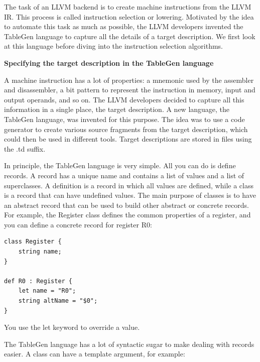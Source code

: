 
The task of an LLVM backend is to create machine instructions from the LLVM IR. This process is called instruction selection or lowering. Motivated by the idea to automate this task as much as possible, the LLVM developers invented the TableGen language to capture all the details of a target description. We first look at this language before diving into the instruction selection algorithms.\par

\hspace*{\fill} \par %
\textbf{Specifying the target description in the TableGen language}

A machine instruction has a lot of properties: a mnemonic used by the assembler and disassembler, a bit pattern to represent the instruction in memory, input and output operands, and so on. The LLVM developers decided to capture all this information in a single place, the target description. A new language, the TableGen language, was invented for this purpose. The idea was to use a code generator to create various source fragments from the target description, which could then be used in different tools. Target descriptions are stored in files using the .td suffix.\par

In principle, the TableGen language is very simple. All you can do is define records. A record has a unique name and contains a list of values and a list of superclasses. A definition is a record in which all values are defined, while a class is a record that can have undefined values. The main purpose of classes is to have an abstract record that can be used to build other abstract or concrete records. For example, the Register class defines the common properties of a register, and you can define a concrete record for register R0:\par

\begin{lstlisting}[caption={}]
class Register {
	string name;
}

def R0 : Register {
	let name = "R0";
	string altName = "$0";
}
\end{lstlisting}

You use the let keyword to override a value.\par

The TableGen language has a lot of syntactic sugar to make dealing with records easier. A class can have a template argument, for example:\par

